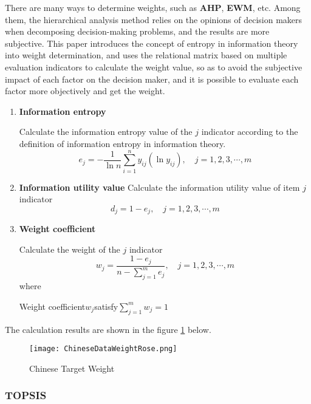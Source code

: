 \documentclass[12pt]{article}
\begin{document}
	There are many ways to determine weights, such as \textbf{AHP}, \textbf{EWM}, etc.
	Among them, the hierarchical analysis method relies on the opinions of decision makers when decomposing decision-making problems, and the results are more subjective.
	This paper introduces the concept of entropy in information theory into weight determination, and uses the relational matrix based on multiple evaluation indicators to calculate the weight value, so as to avoid the subjective impact of each factor on the decision maker, and it is possible to evaluate each factor more objectively and get the weight.
	\begin{enumerate}
		\item \textbf{Information entropy}
		
		Calculate the information entropy value of the $j$ indicator according to the definition of information entropy in information theory.
		\begin{equation}\label{eq:comentropy}
			e_{j}=-\frac{1}{\ln n}  {\sum_{i = 1}^{n} y_{ij} (\ln y_{ij})}, \quad j=1,2,3,\cdots,m
		\end{equation}
		
		\item \textbf{Information utility value}
		Calculate the information utility value of item $j$ indicator
		\begin{equation}\label{eq:utility_value}
			d_{j}=1-e_{j}, \quad j=1,2,3,\cdots,m
		\end{equation}
		
		\item \textbf{Weight coefficient}
		
		Calculate the weight of the $j$ indicator
		\begin{equation}\label{eq:weight}
			w_{j}=\frac{1-e_{j}}{n-\sum_{j=1}^{m} e_{j}}, \quad j=1,2,3,\cdots,m
		\end{equation}
		where
		
		\qquad Weight coefficient$w_{j}$satisfy$\sum_{j=1}^{m} w_{j} = 1$
	\end{enumerate}
	The calculation results are shown in the figure \ref{fig:rose} below.
	
	\begin{figure}[!htbp]
		\centering
		\texttt{[image: ChineseDataWeightRose.png]}
		\caption{Chinese Target Weight}\label{fig:rose}
	\end{figure}
	
	\subsubsection{TOPSIS}
	
\end{document}
